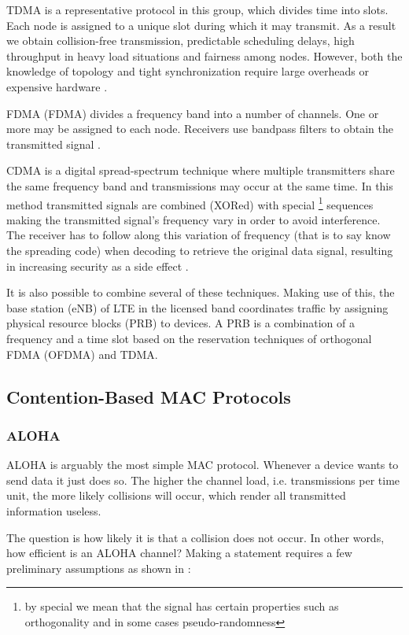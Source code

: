 TDMA is a representative protocol in this group, which divides time into slots. Each node is assigned to a unique slot during which it may transmit. As a result we obtain collision-free transmission, predictable scheduling delays, high throughput in heavy load situations and fairness among nodes. However, both the knowledge of topology and tight synchronization require large overheads or expensive hardware \cite{Bachir10}.

FDMA (FDMA) divides a frequency band into a number of channels. One or more may be assigned to each node. Receivers use bandpass filters to obtain the transmitted signal \cite{Garg07}.

CDMA is a digital spread-spectrum technique where multiple transmitters share the same frequency band and transmissions may occur at the same time. In this method transmitted signals are combined (XORed) with special \footnote{by special we mean that the signal has certain properties such as orthogonality and in some cases pseudo-randomness} sequences making the transmitted signal's frequency vary in order to avoid interference. The receiver has to follow along this variation of frequency (that is to say know the spreading code) when decoding to retrieve the original data signal, resulting in increasing security as a side effect \cite{Garg07}.

It is also possible to combine several of these techniques. Making use of this, the base station (eNB) of LTE in the licensed band coordinates traffic by assigning physical resource blocks (PRB) to devices. A PRB is a combination of a frequency and a time slot based on the reservation techniques of orthogonal FDMA (OFDMA) and TDMA. 

\subsection{Contention-Based MAC Protocols}
\subsubsection{ALOHA}
\label{sec:aloha}

ALOHA is arguably the most simple MAC protocol. Whenever a device wants to send data it just does so. The higher the channel load, i.e. transmissions per time unit, the more likely collisions will occur, which render all transmitted information useless.

The question is how likely it is that a collision does not occur. In other words, how efficient is an ALOHA channel? Making a statement requires a few preliminary assumptions as shown in \cite{Tanenbaum02}:

